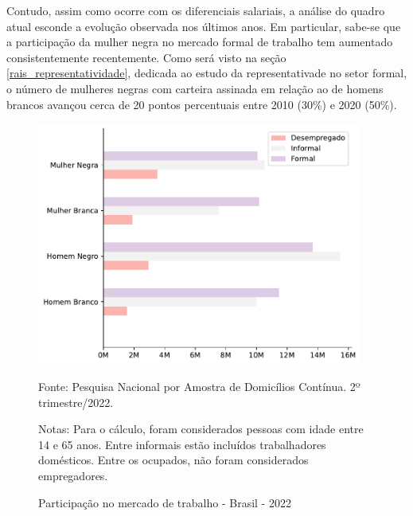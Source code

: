\documentclass[12pt]{article}
\begin{document}
\par Contudo, assim como ocorre com os diferenciais salariais, a análise do quadro atual esconde a evolução observada nos últimos anos. Em particular, sabe-se que a participação da mulher negra no mercado formal de trabalho tem aumentado consistentemente recentemente. Como será visto na seção \ref{rais_representatividade}, dedicada ao estudo da representativade no setor formal, o número de mulheres negras com carteira assinada em relação ao de homens brancos avançou cerca de 20 pontos percentuais entre 2010 (30\%) e 2020 (50\%).

\begin{figure}[H]
    \centering
    \caption{Participação no mercado de trabalho - Brasil - 2022}
        \includegraphics[height=8cm]{../figures/emprego.pdf}
    \label{fig:employment}
    \begin{floatnotes}
        \item[Fonte:] Pesquisa Nacional por Amostra de Domicílios Contínua. 2º trimestre/2022.
        \item[Notas:] Para o cálculo, foram considerados pessoas com idade entre 14 e 65 anos. Entre informais estão incluídos trabalhadores domésticos. Entre os ocupados, não foram considerados empregadores.
    \end{floatnotes}
\end{figure}
\end{document}
